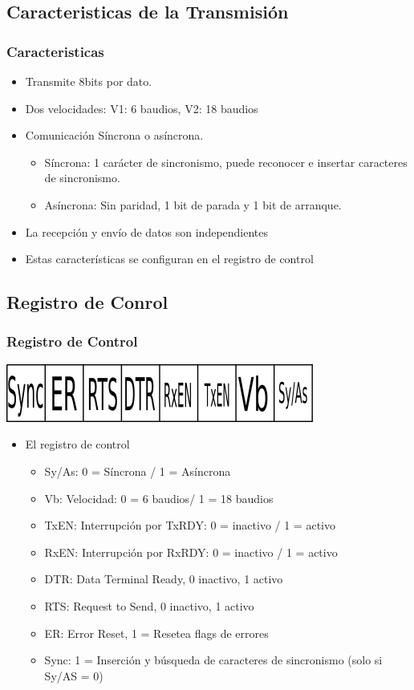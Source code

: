 \documentclass{beamer}
\begin{document}
\subsection{Caracteristicas de la Transmisión}
\begin{frame}
\frametitle{Caracteristicas}
\begin{itemize}
 \item Transmite 8bits por dato.
 \item Dos velocidades: V1: 6 baudios, V2: 18 baudios
 \item Comunicación Síncrona o asíncrona.
  \begin{itemize}
   \item Síncrona: 1 carácter de sincronismo, puede reconocer e insertar caracteres de sincronismo.
   \item Asíncrona: Sin paridad, 1 bit de parada y 1 bit de arranque.
  \end{itemize}
 \item La recepción y envío de datos son independientes
 \item Estas características se configuran en el registro de control
\end{itemize}
\end{frame}

\subsection{Registro de Conrol}
\begin{frame}
\frametitle{Registro de Control}
\begin{center}
 \includegraphics[scale=0.50]{usart-ctrl.png}
\end{center}

\begin{itemize}
 \item El registro de control 
 \begin{itemize}
   \item Sy/As: 0 = Síncrona / 1 = Asíncrona
   \item Vb: Velocidad: 0 = 6 baudios/ 1 = 18 baudios
   \item TxEN: Interrupción por TxRDY:  0 = inactivo / 1 = activo
   \item RxEN: Interrupción por RxRDY:  0 = inactivo / 1 = activo
   \item DTR: Data Terminal Ready, 0 inactivo, 1 activo
   \item RTS: Request to Send, 0 inactivo, 1 activo
   \item ER: Error Reset, 1 = Resetea flags de errores
   \item Sync: 1 = Inserción y búsqueda de caracteres de sincronismo (solo si Sy/AS = 0)
  \end{itemize}
\end{itemize}
\end{frame}
\end{document}

